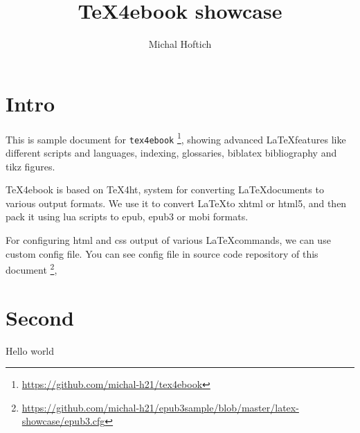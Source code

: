 \documentclass{article}
\begin{document}
	\title{TeX4ebook showcase}
	\author{Michal Hoftich}
	\maketitle
	\tableofcontents
	\section{Intro}

	This is sample document for \verb|tex4ebook|%
	\footnote{\url{https://github.com/michal-h21/tex4ebook}}, 
	showing advanced \LaTeX features like different scripts and languages, 
	indexing, glossaries, biblatex bibliography and tikz figures.
	
	TeX4ebook is based on TeX4ht, system for converting \LaTeX documents to 
	various output formats. We use it to convert \LaTeX to xhtml or html5, 
	and then pack it using lua scripts to epub, epub3 or mobi formats.

	For configuring html and css output of various \LaTeX commands, 
	we can use custom config file. You can see config file in source code
	repository of this document%
	\footnote{\url{https://github.com/michal-h21/epub3sample/blob/master/latex-showcase/epub3.cfg}},
	
	
	\section{Second}
	Hello world
	\printglossaries
	\printbibliography
{}
	\printindex
\end{document}

